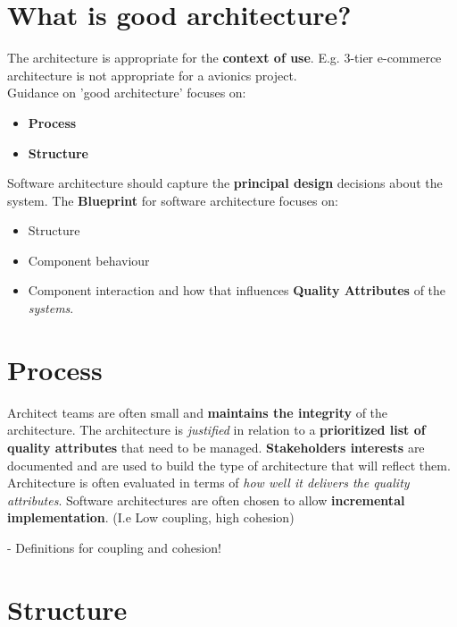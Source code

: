 \documentclass[a4paper]{report}
\begin{document}
\section{What is good architecture?}
The architecture is appropriate for the \textbf{context of use}. E.g. 3-tier e-commerce architecture is not appropriate for a avionics project.\\

Guidance on 'good architecture' focuses on:
\begin{itemize}
\item \textbf{Process}
\item \textbf{Structure}\\
\end{itemize}



Software architecture should capture the \textbf{principal design} decisions about the system. The \textbf{Blueprint} for software architecture focuses on:
\begin{itemize}
\item Structure
\item Component behaviour
\item Component interaction and how that influences \textbf{Quality Attributes} of the \textit{systems}.\\
\end{itemize}

\section{Process}
Architect teams are often small and \textbf{maintains the integrity} of the architecture. The architecture is \textit{justified} in relation to a \textbf{prioritized list of quality attributes} that need to be managed. \textbf{Stakeholders interests} are documented and are used to build the type of architecture that will reflect them.\\

Architecture is often evaluated in terms of \textit{how well it delivers the quality attributes}. Software architectures are often chosen to allow \textbf{incremental implementation}. (I.e Low coupling, high cohesion)

- Definitions for coupling and cohesion!

\section{Structure}
\end{document}
